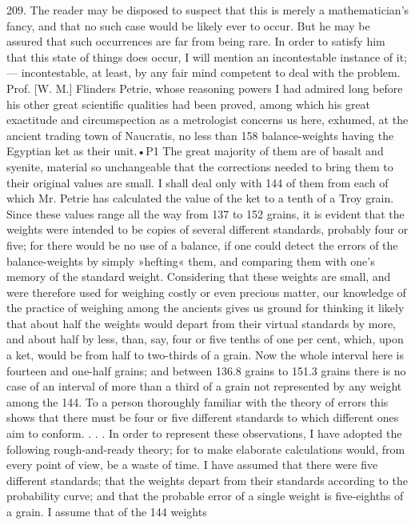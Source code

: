 209. The reader may be disposed to suspect that this is merely a mathematician's fancy, and that no such case would be likely ever to occur. But he may be assured that such occurrences are far from being rare. In order to satisfy him that this state of things does occur, I will mention an incontestable instance of it; — incontestable, at least, by any fair mind competent to deal with the problem. Prof. [W. M.] Flinders Petrie, whose reasoning powers I had admired long before his other great scientific qualities had been proved, among which his great exactitude and circumspection as a metrologist concerns us here, exhumed, at the ancient trading town of Naucratis, no less than 158 balance-weights having the Egyptian ket as their unit.•P1 The great majority of them are of basalt and syenite, material so unchangeable that the corrections needed to bring them to their original values are small. I shall deal only with 144 of them from each of which Mr. Petrie has calculated the value of the ket to a tenth of a Troy grain. Since these values range all the way from 137 to 152 grains, it is evident that the weights were intended to be copies of several different standards, probably four or five; for there would be no use of a balance, if one could detect the errors of the balance-weights by simply »hefting« them, and comparing them with one's memory of the standard weight. Considering that these weights are small, and were therefore used for weighing costly or even precious matter, our knowledge of the practice of weighing among the ancients gives us ground for thinking it likely that about half the weights would depart from their virtual standards by more, and about half by less, than, say, four or five tenths of one per cent, which, upon a ket, would be from half to two-thirds of a grain. Now the whole interval here is fourteen and one-half grains; and between 136.8 grains to 151.3 grains there is no case of an interval of more than a third of a grain not represented by any weight among the 144. To a person thoroughly familiar with the theory of errors this shows that there must be four or five different standards to which different ones aim to conform. . . . In order to represent these observations, I have adopted the following rough-and-ready theory; for to make elaborate calculations would, from every point of view, be a waste of time. I have assumed that there were five different standards; that the weights depart from their standards according to the probability curve; and that the probable error of a single weight is five-eighths of a grain. I assume that of the 144 weights
